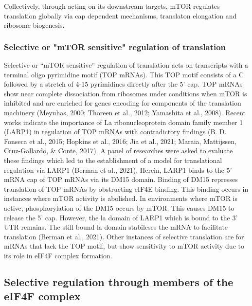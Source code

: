 \documentclass[12pt,openany]{book}
\begin{document}
Collectively, through acting on its downstream targets, mTOR regulates
translation globally via cap dependent mechanisms, translaton elongation
and ribosome biogenesis.

\subsubsection{Selective or "mTOR sensitive" regulation of translation}

Selective or ``mTOR sensitive'' regulation of translation acts on
transcripts with a terminal oligo pyrimidine motif (TOP mRNAs). This TOP
motif consists of a C followed by a stretch of 4-15 pyrimidines directly
after the 5' cap. TOP mRNAs show near complete dissociation from
ribosomes under conditions when mTOR is inhibited and are enriched for
genes encoding for components of the translation machinery (Meyuhas,
2000; Thoreen et al., 2012; Yamashita et al., 2008). Recent works
indicate the importance of La ribonucleoprotein domain family member 1
(LARP1) in regulation of TOP mRNAs with contradictory findings (B. D.
Fonseca et al., 2015; Hopkins et al., 2016; Jia et al., 2021; Maraia,
Mattijssen, Cruz-Gallardo, \& Conte, 2017). A panel of researches were
asked to evaluate these findings which led to the establishment of a
model for translational regulation via LARP1 (Berman et al., 2021).
Herein, LARP1 binds to the 5' mRNA cap of TOP mRNAs via its DM15 domain.
Binding of DM15 represses translation of TOP mRNAs by obstructing eIF4E
binding. This binding occurs in instances where mTOR activity is
abolished. In environments where mTOR is active, phosphorylation of the
DM15 occurs by mTOR. This causes DM15 to release the 5' cap. However,
the la domain of LARP1 which is bound to the 3' UTR remains. The still
bound la domain stabileses the mRNA to facilitate translation (Berman et
al., 2021). Other instances of selective translation are for mRNAs that
lack the TOP motif, but show sensitivity to mTOR activity due to its
role in eIF4F complex formation.

\subsection{Selective regulation through members of the eIF4F complex} \label{sel4F}
\end{document}
